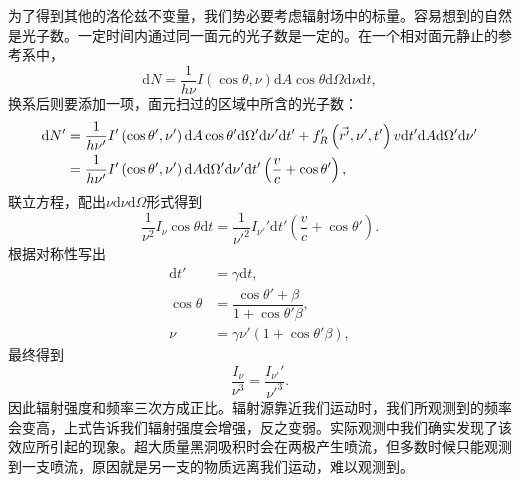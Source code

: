 \documentclass[../天体物理基础.tex]{subfiles}
\begin{document}
为了得到其他的洛伦兹不变量，我们势必要考虑辐射场中的标量。容易想到的自然是光子数。一定时间内通过同一面元的光子数是一定的。在一个相对面元静止的参考系中，
\begin{equation}
\mathrm{d}N=\frac{1}{h\nu}I\left(\cos\theta,\nu\right)\mathrm{d}A\cos\theta\mathrm{d}\Omega\mathrm{d}\nu \mathrm{d}t,
\end{equation}
换系后则要添加一项，面元扫过的区域中所含的光子数：
\begin{align}
\mathrm{d}N'&=\frac{1}{h\nu'}I'\left(\cos\theta',\nu'\right)\mathrm{d}A\cos\theta'\mathrm{d}\Omega'\mathrm{d}\nu' \mathrm{d}t'+f_{R}'\left(\vec{r'},\nu',t'\right)v\mathrm{d}t'\mathrm{d}A\mathrm{d}\Omega'\mathrm{d}\nu'\notag\\
&=\frac{1}{h\nu'}I'\left(\cos\theta',\nu'\right)\mathrm{d}A\mathrm{d}\Omega'\mathrm{d}\nu'\mathrm{d}t'\left(\frac{v}{c}+\cos\theta'\right),
\end{align}
联立方程，配出$\nu\mathrm{d}\nu\mathrm{d}\Omega$形式得到
\begin{equation}
\frac{1}{\nu^2}I_{\nu}\cos\theta\mathrm{d}t=\frac{1}{\nu'^2}I_{\nu'}'\mathrm{d}t'\left(\frac{v}{c}+\cos\theta'\right).
\end{equation}
根据对称性写出
\begin{align}
\mathrm{d}t'&=\gamma\mathrm{d}t,\\
\cos\theta&=\dfrac{\cos\theta'+\beta}{1+\cos\theta'\beta},\\
\nu&=\gamma\nu'\left(1+\cos\theta'\beta\right),
\end{align}
最终得到
\begin{equation}
\frac{I_{\nu}}{\nu^3}=\frac{I_{\nu'}'}{\nu'^3}.
\end{equation}
因此辐射强度和频率三次方成正比。辐射源靠近我们运动时，我们所观测到的频率会变高，上式告诉我们辐射强度会增强，反之变弱。实际观测中我们确实发现了该效应所引起的现象。超大质量黑洞吸积时会在两极产生喷流，但多数时候只能观测到一支喷流，原因就是另一支的物质远离我们运动，难以观测到。
\end{document}
